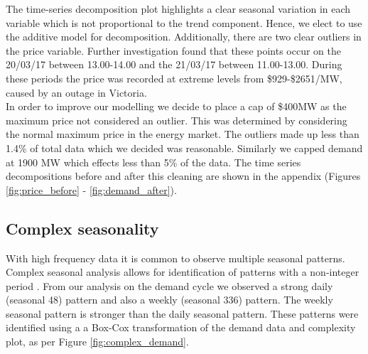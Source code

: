 \documentclass[11pt]{article}
\begin{document}
\noindent The time-series decomposition plot highlights a clear seasonal variation in each variable which is not proportional to the trend component. Hence, we elect to use the additive model for decomposition. Additionally, there are two clear outliers in the price variable.
Further investigation found that these points occur on the 20/03/17 between 13.00-14.00 and the 21/03/17 between 11.00-13.00. During these periods the price was recorded at extreme levels from \$929-\$2651/MW, caused by an outage in Victoria.
\\

\noindent In order to improve our modelling we decide to place a cap of \$400MW as the maximum price not considered an outlier. This was determined by considering the normal maximum price in the energy market. The outliers made up less than 1.4\% of total data which we decided was reasonable. Similarly we capped demand at 1900 MW which effects less than 5\% of the data. The time series decompositions before and after this cleaning are shown in the appendix (Figures \ref{fig:price_before} - \ref{fig:demand_after}).

\subsection{Complex seasonality}

With high frequency data it is common to observe multiple seasonal patterns. Complex seasonal analysis allows for identification of patterns with a non-integer period \citep{de_livera_forecasting_2011}. From our analysis on the demand cycle we observed a strong daily (seasonal 48) pattern and also a weekly (seasonal 336) pattern. The weekly seasonal pattern is stronger than the daily seasonal pattern. These patterns were identified using a a Box-Cox transformation of the demand data and complexity plot, as per Figure \ref{fig:complex_demand}.
\\
\end{document}
